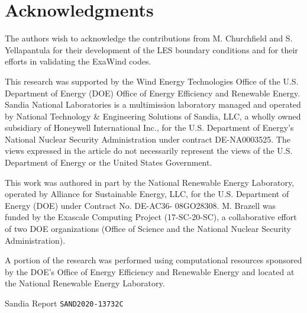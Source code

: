 \documentclass[conf]{new-aiaa}
\begin{document}



\section*{Acknowledgments}

The authors wish to acknowledge the contributions from M. Churchfield
and S. Yellapantula for their development of the LES boundary
conditions and for their efforts in validating the ExaWind codes.

This research was supported by the Wind Energy Technologies Office of the
U.S. Department of Energy (DOE) Office of Energy Efficiency and Renewable
Energy.  Sandia National Laboratories is a multimission laboratory managed and
operated by National Technology \& Engineering Solutions of Sandia, LLC, a
wholly owned subsidiary of Honeywell International Inc., for the U.S. Department
of Energy's National Nuclear Security Administration under contract
DE-NA0003525. The views expressed in the article do not necessarily represent
the views of the U.S. Department of Energy or the United States Government.

This work was authored in part by the National Renewable Energy Laboratory,
operated by Alliance for Sustainable Energy, LLC, for the U.S. Department of
Energy (DOE) under Contract No. DE-AC36- 08GO28308. M. Brazell was funded by the
Exascale Computing Project (17-SC-20-SC), a collaborative effort of two DOE
organizations (Office of Science and the National Nuclear Security
Administration).

A portion of the research was performed using computational resources sponsored
by the DOE's Office of Energy Efficiency and Renewable Energy and located at the
National Renewable Energy Laboratory.

Sandia Report \texttt{SAND2020-13732C}


\end{document}
